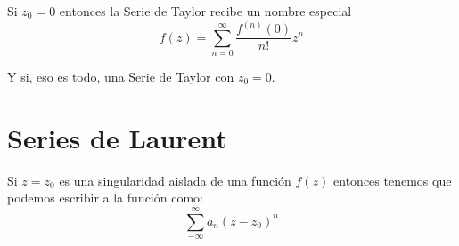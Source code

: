 \documentclass[12pt, fleqn]{report}                             %
\theoremstyle{break}                                            %
\begin{document}
            Si $z_0 = 0$ entonces la Serie de Taylor recibe un nombre especial
            \begin{equation*}
                f(z) = \sum_{n=0}^\infty \dfrac{f^{(n)}(0)}{n!} z^n
            \end{equation*}

            Y si, eso es todo, una Serie de Taylor con $z_0 = 0$. 






        \clearpage
        \section{Series de Laurent}

            Si $z = z_0$ es una singularidad aislada de una función $f(z)$ entonces tenemos
            que podemos escribir a la función como:
            \begin{equation*}
                \sum_{-\infty}^\infty a_{n}(z - z_0)^n
            \end{equation*}
\end{document}
